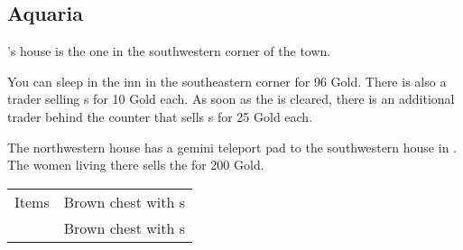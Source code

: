 \subsection{Aquaria}
\label{map:aquaria}

's house is the one in the southwestern corner of the town. 

You can sleep in the inn in the southeastern corner for 96 Gold. There is also a trader selling s for 10 Gold each.  As soon as the  is cleared, there is an additional trader behind the counter that sells s for 25 Gold each.

The northwestern house has a gemini teleport pad to the southwestern house in . The women living there sells the  for 200 Gold.

\noindent\begin{tabularx}{\textwidth}[l]{lX}
	Items & Brown chest with \nameref{item:heal_potion}s \\
	& Brown chest with \nameref{item:refresher}s
\end{tabularx}

